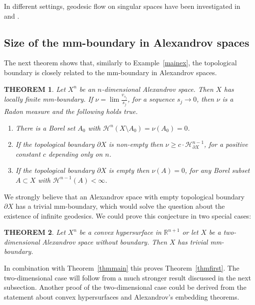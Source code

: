 \documentclass[12pt,leqno]{amsart}
\numberwithin{equation}{section}
\newtheorem{thm}{THEOREM}[section]
\theoremstyle{definition}
\theoremstyle{remark}
\newcommand{\tref}[1]{Theorem~\ref{#1}}
\newcommand{\exref}[1]{Example~\ref{#1}}
\newcommand{\R}{\mathbb{R}}
\begin{document}
In different  settings, geodesic flow  on singular spaces have been investigated in \cite{BallmannBrin} and \cite{Bamler}.

\subsection{Size of the mm-boundary in Alexandrov spaces}
The next theorem shows that, similarly to \exref{mainex},  the topological boundary is closely related to the mm-boundary in Alexandrov spaces.

\begin{thm} \label{alexandrovthm}
Let $X^n$ be an  $n$-dimensional Alexandrov space. Then $X$ has locally finite mm-boundary.
If  $ \nu= \lim     \frac{v_{s_j}}{s_j}$,  for  a sequence  $s_j \to 0 $,  then $\nu$ is a Radon measure and
 the following holds true.
\begin{enumerate}
\item\label{full-measure-zero-nu}There is a Borel set $A_0$ with $\mathcal H^n (X\setminus A_0) = \nu (A_0)=0$.
\item\label{bry-nu} If the topological boundary $\partial X$ is non-empty then $\nu \geq c \cdot \mathcal H^{n-1} _{\partial X}$,
for a positive constant $c$ depending only on $n$.
\item \label{n-1-nu} If the topological boundary $\partial X$ is empty then $\nu (A)=0$, for any Borel subset $A\subset X$ with  $\mathcal H^{n-1} (A)<\infty$.
\end{enumerate}
\end{thm}

 We strongly believe that an Alexandrov space with empty topological boundary $\partial X$  has a trivial mm-boundary,
which would solve the question about the existence of infinite geodesics.
We could prove this conjecture in two special cases:



\begin{thm} \label{hypersurface}
Let $X^n$ be a convex hypersurface in $\R^{n+1}$  or let $X$ be a two-dimensional  Alexandrov space without boundary. Then $X$ has trivial mm-boundary.
\end{thm}


In combination with \tref{thmmain} this proves \tref{thmfirst}.
The two-dimensional case
will follow from a much stronger result discussed in the next subsection.
  Another proof of  the  two-dimensional case could be derived   from  the statement about convex hypersurfaces and  Alexandrov's embedding theorems.
\end{document}
